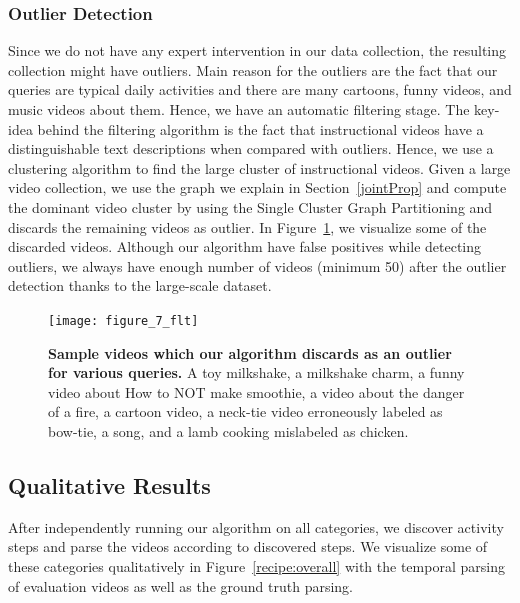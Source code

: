 \subsubsection{Outlier Detection}
\label{filter}
\vspace{-1mm}
Since we do not have any expert intervention in our data collection, the resulting collection might have outliers. Main reason for the outliers are  the fact that our queries are typical daily activities and there are many cartoons, funny videos, and music videos about them. Hence, we have an automatic filtering stage. The key-idea behind the filtering algorithm is the fact that instructional videos have a distinguishable text descriptions when compared with outliers. Hence, we use a clustering algorithm to find the large cluster of instructional videos. Given a large video collection, we use the graph we explain in Section~\ref{jointProp} and compute the dominant video cluster by using the Single Cluster Graph Partitioning \cite{scgp} and discards the remaining videos as outlier. In Figure~\ref{outliers}, we visualize some of the discarded videos. Although our algorithm have false positives while detecting outliers, we always have enough number of videos (minimum 50) after the outlier detection thanks to the large-scale dataset.

\begin{figure}[ht]
    \texttt{[image: figure\_7\_flt]}
\caption{\textbf{Sample videos which our algorithm discards as an outlier for various queries.}
A toy milkshake, a milkshake charm, a funny video about How to NOT make smoothie, a video about the danger of a fire, a cartoon video, a neck-tie video erroneously labeled as bow-tie, a song, and a lamb cooking mislabeled as chicken.}
\label{outliers}
\vspace{-3mm}
\end{figure}

\vspace{-1mm}
\subsection{Qualitative Results}
\vspace{-1mm}
After independently running our algorithm on all categories, we discover activity steps and parse the videos according to discovered steps. We visualize some of these categories qualitatively in Figure~\ref{recipe:overall} with the temporal parsing of evaluation videos as well as the ground truth parsing.

